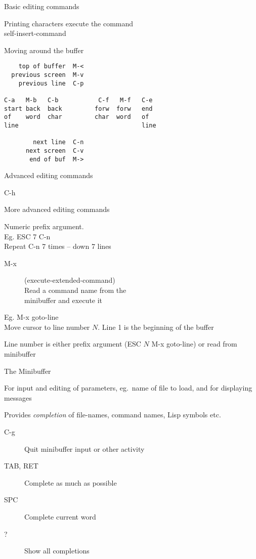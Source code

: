 \begin{slide}{}
Basic editing commands

Printing characters execute the command \\
self-insert-command

Moving around the buffer
\begin{verbatim}
    top of buffer  M-<
  previous screen  M-v
    previous line  C-p

C-a   M-b   C-b           C-f   M-f   C-e
start back  back         forw  forw   end
of    word  char         char  word   of
line                                  line

        next line  C-n
      next screen  C-v
       end of buf  M->
\end{verbatim}
\end{slide}

\begin{slide}{}
Advanced editing commands

\vspace{5cm}
\centering
\LARGE
C-h
\vspace{5cm}
\end{slide}

\begin{slide}{}
More advanced editing commands

Numeric prefix argument. \\
Eg. ESC 7 C-n \\
Repeat C-n 7 times -- down 7 lines

\begin{description}
\item[M-x]
(execute-extended-command) \\
Read a command name from the \\
minibuffer and execute it
\end{description}

Eg. M-x goto-line \\
Move cursor to line number $N$.
Line 1 is the beginning of the buffer

Line number is either prefix argument (ESC $N$ M-x goto-line) or read
from minibuffer
\end{slide}

\begin{slide}{}
The Minibuffer

For input and editing of parameters, eg.\ name of file to load, and
for displaying messages

Provides {\em completion} of file-names, command names, Lisp symbols
etc.

\begin{description}
\item[C-g]
Quit minibuffer input or other activity
\item[TAB, RET]
Complete as much as possible
\item[SPC]
Complete current word
\item[?]
Show all completions
\end{description}
\end{slide}

